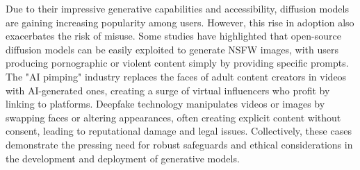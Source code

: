 Due to their impressive generative capabilities and accessibility, diffusion models are gaining increasing popularity among users. However, this rise in adoption also exacerbates the risk of misuse. Some studies have highlighted that open-source diffusion models can be easily exploited to generate NSFW images, with users producing pornographic or violent content simply by providing specific prompts\cite{Javier2022redteaming,patrick2023safe}. 
The "AI pimping" industry \cite{ai-pimping} replaces the faces of adult content creators in videos with AI-generated ones, creating a surge of virtual influencers who profit by linking to platforms. 
Deepfake \cite{deepfake} technology manipulates videos or images by swapping faces or altering appearances, often creating explicit content without consent, leading to reputational damage and legal issues. Collectively, these cases demonstrate the pressing need for robust safeguards and ethical considerations in the development and deployment of generative models. 




